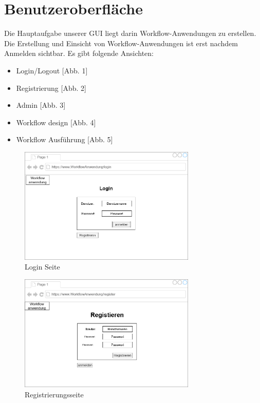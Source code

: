 \chapter{Benutzeroberfläche}
    Die Hauptaufgabe unserer GUI liegt darin Workflow-Anwendungen zu erstellen. Die Erstellung und Einsicht von Workflow-Anwendungen ist erst nachdem Anmelden sichtbar. Es gibt folgende Ansichten:
    \begin{itemize}
        \item Login/Logout [Abb. 1]
        \item Registrierung [Abb. 2]
        \item Admin [Abb. 3]
        \item Workflow design [Abb. 4]
        \item Workflow Ausführung [Abb. 5]
    \end{itemize}

    \begin{figure}[ht]
 \centering
 \includegraphics[width = 0.75\textwidth]{Grafiken/loginGui.drawio.png}
 \caption{Login Seite}
 \label{Abb 1}
\end{figure}

\begin{figure}[ht]
 \centering
 \includegraphics[width = 0.75\textwidth]{Grafiken/registrationGui.drawio.png}
 \caption{Registrierungsseite}
 \label{fig:Abb 2}
\end{figure}

